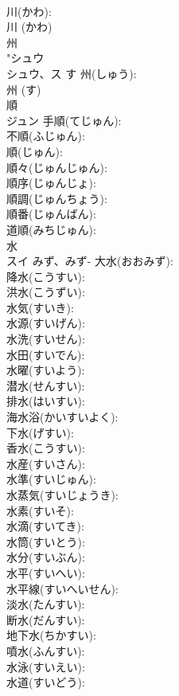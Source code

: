 \documentclass[8pt]{extreport}
\begin{document}
\begin{CJK}{UTF8}{min}
\\	川(かわ): 
\\	川 (かわ)
\\	州			
\\	"シュウ　
\\	シュウ、ス	す	州(しゅう): 
\\	州 (す)
\\	順			
\\	ジュン		手順(てじゅん): 
\\	不順(ふじゅん): 
\\	順(じゅん): 
\\	順々(じゅんじゅん): 
\\	順序(じゅんじょ): 
\\	順調(じゅんちょう): 
\\	順番(じゅんばん): 
\\	道順(みちじゅん): 
\\	水			
\\	スイ	みず、みず-	大水(おおみず): 
\\	降水(こうすい): 
\\	洪水(こうずい): 
\\	水気(すいき): 
\\	水源(すいげん): 
\\	水洗(すいせん): 
\\	水田(すいでん): 
\\	水曜(すいよう): 
\\	潜水(せんすい): 
\\	排水(はいすい): 
\\	海水浴(かいすいよく): 
\\	下水(げすい): 
\\	香水(こうすい): 
\\	水産(すいさん): 
\\	水準(すいじゅん): 
\\	水蒸気(すいじょうき): 
\\	水素(すいそ): 
\\	水滴(すいてき): 
\\	水筒(すいとう): 
\\	水分(すいぶん): 
\\	水平(すいへい): 
\\	水平線(すいへいせん): 
\\	淡水(たんすい): 
\\	断水(だんすい): 
\\	地下水(ちかすい): 
\\	噴水(ふんすい): 
\\	水泳(すいえい): 
\\	水道(すいどう): 

\end{CJK}
\end{document}
